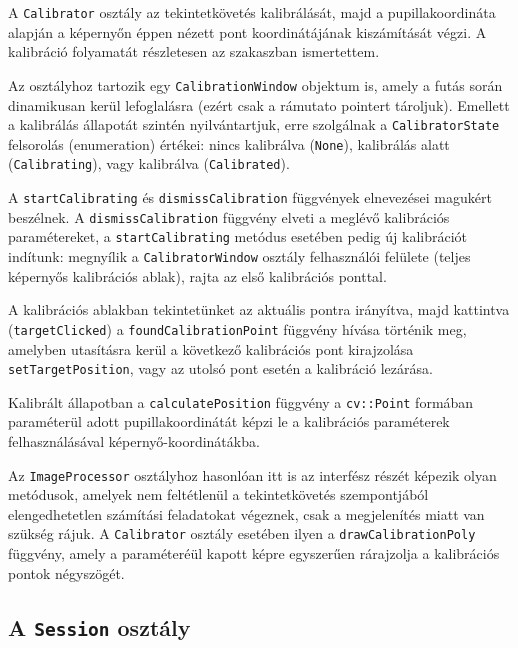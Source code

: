 A \texttt{Calibrator} osztály az tekintetkövetés kalibrálását, majd a pupillakoordináta alapján a képernyőn éppen nézett pont koordinátájának kiszámítását végzi. A kalibráció folyamatát részletesen az  szakaszban ismertettem.

Az osztályhoz tartozik egy \texttt{CalibrationWindow} objektum is, amely a futás során dinamikusan kerül lefoglalásra (ezért csak a rámutato pointert tároljuk). Emellett a kalibrálás állapotát szintén nyilvántartjuk, erre szolgálnak a \texttt{CalibratorState} felsorolás (enumeration) értékei: nincs kalibrálva (\texttt{None}), kalibrálás alatt (\texttt{Calibrating}), vagy kalibrálva (\texttt{Calibrated}).

\bigskip

A \texttt{startCalibrating} és \texttt{dismissCalibration} függvények elnevezései magukért beszélnek. A \texttt{dismissCalibration} függvény elveti a meglévő kalibrációs paramétereket, a \texttt{startCalibrating} metódus esetében pedig új kalibrációt indítunk: megnyílik a \texttt{CalibratorWindow} osztály felhasználói felülete (teljes képernyős kalibrációs ablak), rajta az első kalibrációs ponttal.

A kalibrációs ablakban tekintetünket az aktuális pontra irányítva, majd kattintva (\texttt{targetClicked}) a \texttt{foundCalibrationPoint} függvény hívása történik meg, amelyben utasításra kerül a következő kalibrációs pont kirajzolása \texttt{setTargetPosition}, vagy az utolsó pont esetén a kalibráció lezárása.

\bigskip

Kalibrált állapotban a \texttt{calculatePosition} függvény a \texttt{cv::Point} formában paraméterül adott pupillakoordinátát képzi le a kalibrációs paraméterek felhasználásával képernyő-koordinátákba.

\bigskip

Az \texttt{ImageProcessor} osztályhoz hasonlóan itt is az interfész részét képezik olyan metódusok, amelyek nem feltétlenül a tekintetkövetés szempontjából elengedhetetlen számítási feladatokat végeznek, csak a megjelenítés miatt van szükség rájuk. A \texttt{Calibrator} osztály esetében ilyen a \texttt{drawCalibrationPoly} függvény, amely a paraméteréül kapott képre egyszerűen rárajzolja a kalibrációs pontok négyszögét.

\subsection{A \texttt{Session} osztály}\label{sect:session}

